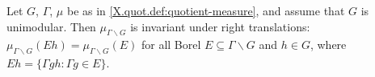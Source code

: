 Let $G$, $\Gamma$, $\mu$ be as in \cref{X.quot.def:quotient-measure}, and assume that $G$ is unimodular. Then
$\mu_{\Gamma\backslash G}$ is invariant under right translations: $\mu_{\Gamma\backslash G}(Eh)=\mu_{\Gamma\backslash G}(E)$
for all Borel $E\subseteq\Gamma\backslash G$ and $h\in G$, where $Eh=\{\Gamma gh:\Gamma g\in E\}$.

